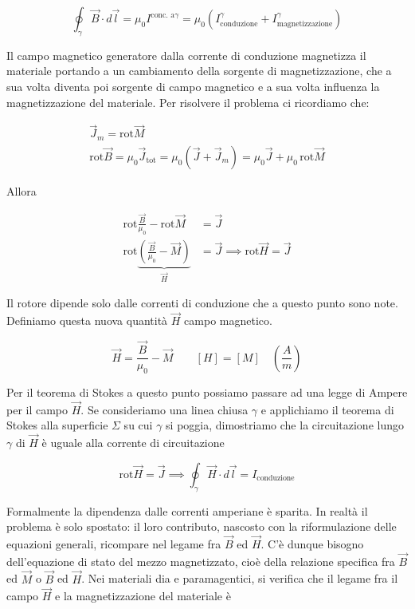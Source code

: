 \[
	\oint_{\gamma} \vec{B} \cdot d\vec{l} = \mu_0 I^{\text{conc. a}\gamma}  = \mu_0 (I_{\text{conduzione}}^{\gamma} + I_{\text{magnetizzazione}}^{\gamma}    )
\]

Il campo magnetico generatore dalla corrente di conduzione magnetizza il materiale portando a un cambiamento della sorgente di magnetizzazione, che a sua volta diventa poi sorgente di campo magnetico e a sua volta influenza la magnetizzazione del materiale. Per risolvere il problema ci ricordiamo che:

\begin{gather*}
	\vec{J}_m=\text{rot}\vec{M} \\
	\text{rot}\vec{B} = \mu_0 \vec{J}_{\text{tot}} = \mu_0 (\vec{J} +\vec{J}_m ) = \mu_0 \vec{J} + \mu_0 \,\text{rot}\vec{M}
\end{gather*}

Allora

\begin{align*}
	\text{rot}\frac{\vec{B}}{\mu_0}-\text{rot}\vec{M} &= \vec{J} \\
	\text{rot} \underbrace{\left( \frac{\vec{B}}{\mu_0}-\vec{M} \right)}_{\vec{H}}   &= \vec{J} \implies  \text{rot}\vec{H} = \vec{J}
\end{align*}

Il rotore dipende solo dalle correnti di conduzione che a questo punto sono note. Definiamo questa nuova quantità $\vec{H}$ campo magnetico.

\[
	\boxed{\vec{H} = \frac{\vec{B}}{\mu_0} - \vec{M}} \qquad [H]=[M] \quad \left( \frac{A}{m} \right)
\]

Per il teorema di Stokes a questo punto possiamo passare ad una legge di Ampere per il campo $\vec{H}$. Se consideriamo una linea chiusa $\gamma$ e applichiamo il teorema di Stokes alla superficie $\Sigma$ su cui $\gamma$ si poggia, dimostriamo che la circuitazione lungo $\gamma$ di $\vec{H}$ è uguale alla corrente di circuitazione

\[
	\text{rot}\vec{H} =\vec{J} \implies \oint_{\gamma} \vec{H} \cdot d\vec{l} = I_{\text{conduzione}}
\]

Formalmente la dipendenza dalle correnti amperiane è sparita. In realtà il problema è solo spostato: il loro contributo, nascosto con la riformulazione delle equazioni generali, ricompare nel legame fra $\vec{B}$ ed $ \vec{H}  $. C'è dunque bisogno dell'equazione di stato del mezzo magnetizzato, cioè della relazione specifica fra $\vec{B}$ ed $ \vec{M}  $ o $\vec{B}$ ed $ \vec{H}  $. Nei materiali dia e paramagentici, si verifica che il legame fra il campo $ \vec{H}  $ e la magnetizzazione del materiale è


